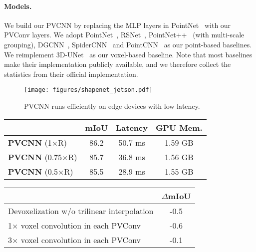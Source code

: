 \documentclass{article}
\newcommand{\myparagraph}[1]{\vspace{-6pt}\paragraph{#1}}
\def\modelshort{PVCNN\xspace}
\def\convshort{PVConv\xspace}
\begin{document}
\myparagraph{Models.}

We build our \modelshort by replacing the MLP layers in PointNet~\cite{Qi:2017vq} with our \convshort layers. We adopt PointNet~\cite{Qi:2017vq}, RSNet~\cite{Huang:2018rs}, PointNet++~\cite{Qi:2017tf} (with multi-scale grouping), DGCNN~\cite{Wang:2018dg}, SpiderCNN~\cite{Xu:2018sp} and PointCNN~\cite{Li:2018tp} as our point-based baselines. We reimplement 3D-UNet~\cite{Cicek:2016un} as our voxel-based baseline. Note that most baselines make their implementation publicly available, and we therefore collect the statistics from their official implementation.



\begin{figure}[!t]
    \centering
    \texttt{[image: figures/shapenet\_jetson.pdf]}
    \caption{\modelshort runs efficiently on edge devices with low latency.}
    \label{fig:shapenet_jetson}
\vspace{-5pt}
\end{figure} \begin{table*}[!t]
\begin{minipage}[b]{0.5\linewidth}
\small\centering
\setlength{\tabcolsep}{4pt}
\begin{tabular}{lccc}
    \toprule
    & mIoU & Latency & GPU Mem.\\
    \midrule
    \textbf{\modelshort} (1$\times$R) & 86.2 & 50.7 ms & 1.59 GB \\
    \midrule
    \textbf{\modelshort} (0.75$\times$R) & 85.7 & 36.8 ms & 1.56 GB \\
    \textbf{\modelshort} (0.5$\times$R) & 85.5 & 28.9 ms & 1.55 GB \\
    \bottomrule
\end{tabular}
\caption{Results of different voxel resolutions.}
\vspace{-5pt}
\label{tab:shapenet_resolutions}
\end{minipage}
\begin{minipage}[b]{0.5\linewidth}
\setlength{\tabcolsep}{3pt}
\small\centering
\begin{tabular}{lc}
    \toprule
    & $\Delta$mIoU \\
    \midrule
Devoxelization w/o trilinear interpolation & -0.5 \\
\midrule
    1$\times$ voxel convolution in each \convshort & -0.6 \\
    3$\times$ voxel convolution in each \convshort & -0.1 \\
    \bottomrule
\end{tabular}
\caption{Results of more ablation studies.}
\vspace{-5pt}
\label{tab:shapenet_ablation}
\end{minipage}
\end{table*}
\end{document}
